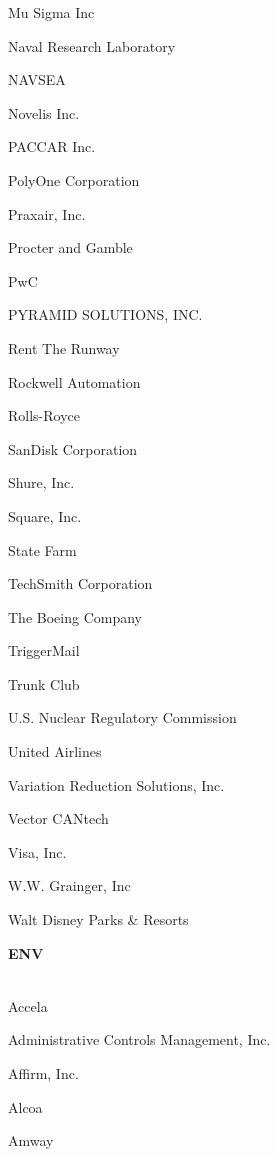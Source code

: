 \documentclass[twoside]{article}
\begin{document}
\begin{center}
\begin{multicols}{5}
\begin{FlushLeft}
\begin{compactitem}
\item Mu Sigma Inc
\item Naval Research Laboratory
\item NAVSEA
\item Novelis Inc.
\item PACCAR Inc.
\item PolyOne Corporation
\item Praxair, Inc.
\item Procter and Gamble
\item PwC
\item PYRAMID SOLUTIONS, INC.
\item Rent The Runway
\item Rockwell Automation
\item Rolls-Royce
\item SanDisk Corporation
\item Shure, Inc.
\item Square, Inc.
\item State Farm
\item TechSmith Corporation
\item The Boeing Company
\item TriggerMail
\item Trunk Club
\item U.S. Nuclear Regulatory Commission
\item United Airlines
\item Variation Reduction Solutions, Inc.
\item Vector CANtech
\item Visa, Inc.
\item W.W. Grainger, Inc
\item Walt Disney Parks \& Resorts
\end{compactitem}
        \end{FlushLeft}
        \vspace{1em}
        {\fontsize{14}{16}\selectfont \bf ENV}\\
        \vspace{-1em}
        ~\hrulefill~
        \vspace{-.9em}
        \begin{FlushLeft}
        \begin{compactitem}
        \item Accela
\item Administrative Controls Management, Inc.
\item Affirm, Inc.
\item Alcoa
\item Amway

\end{compactitem}
\end{FlushLeft}
\end{multicols}
\end{center}
\end{document}

